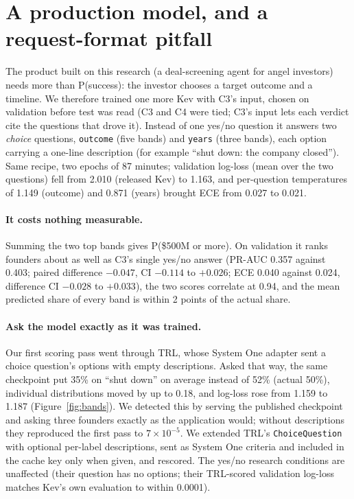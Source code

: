 \documentclass{article}
\newcommand{\cond}[1]{#1}
\begin{document}
\section{A production model, and a request-format pitfall}
\label{sec:production}

The product built on this research (a deal-screening agent for angel investors) needs more than
P(success): the investor chooses a target outcome and a timeline. We therefore trained one more
Kev with \cond{C3}'s input, chosen on validation before test was read (\cond{C3} and \cond{C4} were
tied; \cond{C3}'s input lets each verdict cite the questions that drove it). Instead of one yes/no
question it answers two \emph{choice} questions, \texttt{outcome} (five bands) and \texttt{years}
(three bands), each option carrying a one-line description (for example ``shut down: the company
closed''). Same recipe, two epochs of 87 minutes; validation log-loss (mean over the two
questions) fell from 2.010 (released Kev) to 1.163, and per-question temperatures of 1.149
(outcome) and 0.871 (years) brought ECE from 0.027 to 0.021.

\paragraph{It costs nothing measurable.} Summing the two top bands gives P(\$500M or more). On
validation it ranks founders about as well as \cond{C3}'s single yes/no answer (PR-AUC 0.357
against 0.403; paired difference $-0.047$, CI $-0.114$ to $+0.026$; ECE 0.040 against 0.024,
difference CI $-0.028$ to $+0.033$), the two scores correlate at 0.94, and the mean predicted share
of every band is within 2 points of the actual share.

\paragraph{Ask the model exactly as it was trained.} Our first scoring pass went through TRL, whose
System One adapter sent a choice question's options with empty descriptions. Asked that way, the
same checkpoint put 35\% on ``shut down'' on average instead of 52\% (actual 50\%), individual
distributions moved by up to 0.18, and log-loss rose from 1.159 to 1.187
(Figure~\ref{fig:bands}). We detected this by serving the published checkpoint and asking three
founders exactly as the application would; without descriptions they reproduced the first pass to
$7\times10^{-5}$. We extended TRL's \texttt{ChoiceQuestion} with optional per-label descriptions,
sent as System One criteria and included in the cache key only when given, and rescored. The
yes/no research conditions are unaffected (their question has no options; their TRL-scored
validation log-loss matches Kev's own evaluation to within 0.0001).
\end{document}

